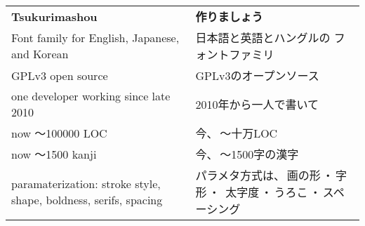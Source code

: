\documentclass[17pt]{extarticle}
\newenvironment{slide}{\clearpage\vspace*{\fill}\large}{\vspace*{\fill}}
\begin{document}
\begin{slide}
\Large
{\hspace*{\fill}
\begin{tabular}[t]{b{4.5in}@{\quad}b{4.5in}}
\huge\bfseries Tsukurimashou &
  \huge\bfseries 作りましょう\\[20pt]
\raggedright Font family for English, Japanese, and Korean &
日本語と英語とハングルの フォントファミリ\\[20pt]
\raggedright GPLv3 open source & GPLv3のオープンソース \\[20pt]
\raggedright one developer working since late 2010 &
2010年から一人で書いて\\[20pt]
now 〜100000 LOC & 今、\,〜十万LOC \\[20pt]
now 〜1500 kanji & 今、\,〜1500字の漢字 \\[20pt]
paramaterization: stroke style, shape, boldness, serifs, spacing &
パラメタ方式は、\,画の形\,・\,字形\,・\,
太字度\,・\,うろこ\,・\,スペーシング
\end{tabular}\hspace*{\fill}\par}
\end{slide}


\begin{slide}
\end{slide}


\begin{slide}
\end{slide}

\end{document}
